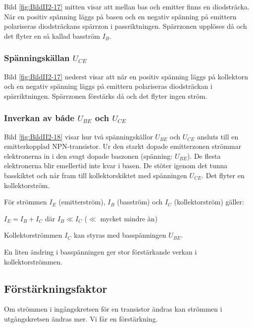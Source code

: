 Bild \ref{fig:BildII2-17} mitten visar att mellan bas och emitter finns en diodsträcka.
När en positiv spänning läggs på basen och en negativ spänning på emittern polariseras diodsträckans spärrzon i passriktningen.
Spärrzonen upplöses då och det flyter en så kallad basström \(I_B\).

\subsubsection{Spänningskällan \(U_{CE}\)}

Bild \ref{fig:BildII2-17} nederst visar att när en positiv spänning läggs på kollektorn och en negativ spänning läggs på emittern polariseras diodsträckan i spärriktningen.
Spärrzonen förstärks då och det flyter ingen ström.

\subsubsection{Inverkan av både \(U_{BE}\) och \(U_{CE}\)}

Bild \ref{fig:BildII2-18} visar hur två spänningskällor \(U_{BE}\) och
\(U_{CE}\) ansluts till en emitterkopplad NPN-transistor.
Ur den starkt dopade emitterzonen strömmar elektronerna in i den svagt dopade
baszonen (spänning: \(U_{BE}\)).
De flesta elektronerna blir emellertid inte kvar i basen.
De stöter igenom det tunna basskiktet och når fram till
kollektorskiktet med spänningen \(U_{CE}\). Det flyter en kollektorström.

För strömmen \(I_E\) (emitterström), \(I_B\) (basström) och \(I_C\)
(kollektorström) gäller:

\(I_E = I_B + I_C\) där \(I_B \ll I_C\) (\(\ll\) mycket mindre än)

Kollektorströmmen \(I_C\) kan styras med basspänningen \(U_{BE}\).

En liten ändring i basspänningen ger stor förstärkande verkan i
kollektorströmmen.


\subsection{Förstärkningsfaktor}

Om strömmen i ingångskretsen för en transistor ändras kan strömmen i utgångskretsen ändras mer. 
Vi får en förstärkning.

